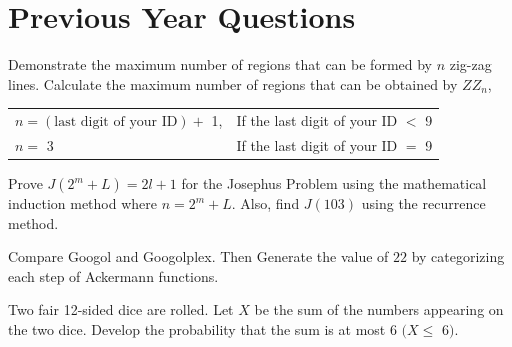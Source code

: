 \chapter{Previous Year Questions}


\begin{Question}[6][F-24]
   Demonstrate the maximum number of regions that can be formed by $n$ zig-zag lines. Calculate the maximum number of regions that can be obtained by $ZZ_n$,\\[0.5em]
   \begin{tabular}{ll}
      $n = (\text{last digit of your ID}) +$ 1, &
      If the last digit of your ID $<$ 9 \\
      
      $n =$ 3 & 
      If the last digit of your ID $=$ 9
   \end{tabular}
\end{Question}

\vspace{2em}
\begin{Question}[6][F-24]
   Prove $J (2^m + L) = 2l + 1$ for the Josephus Problem using the mathematical induction method where $n = 2^m+L$. Also, find $J(103)$ using the recurrence method.
\end{Question}


\vspace{2em}

Compare Googol and Googolplex. Then Generate the value of $22$ by
categorizing each step of Ackermann functions.

Two fair 12-sided dice are rolled. Let $X$ be the sum of the numbers appearing on the two dice. Develop the probability that the sum is at most 6 $(X \leq$ 6$)$.

